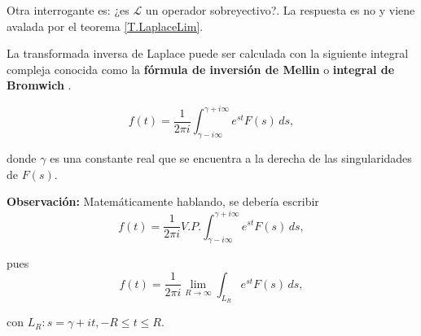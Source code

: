 Otra interrogante es: ¿es $\mathcal{L}$ un operador sobreyectivo?. La respuesta es no y viene avalada por el teorema \ref{T.LaplaceLim}.

La transformada inversa de Laplace puede ser calculada con la siguiente integral compleja conocida como la \textbf{fórmula de inversión de Mellin} o \textbf{integral de Bromwich} \cite{Arfken}.
\begin{shaded}
   $$ f(t) = \frac{1}{2\pi i} \int_{\gamma - i \infty}^{\gamma + i \infty} e^{st} F(s) \,ds,$$
\end{shaded}

donde $\gamma$ es una constante real que se encuentra a la derecha de las singularidades de $F(s)$.

\textbf{Observación:} Matemáticamente hablando, se debería escribir $$f(t) = \frac{1}{2\pi i} V.P. \int_{\gamma - i \infty}^{\gamma + i \infty} e^{st} F(s) \,ds,$$ 

pues 
$$f(t) = \frac{1}{2\pi i} \lim_{R \to \infty} \int_{L_R} e^{st} F(s) \,ds,$$ 

con $L_R: s = \gamma + it, - R\leq t \leq R$.







